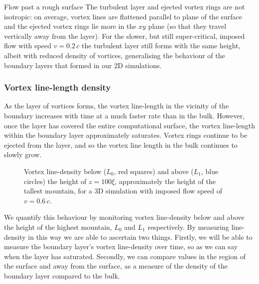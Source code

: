 \begin{chapter}{\label{cha:afm}Flow past a rough surface}
The turbulent layer and ejected vortex rings are not isotropic: on average, vortex lines are flattened parallel to plane of the surface and the ejected vortex rings lie more in the $xy$ plane (so that they travel vertically away from the layer). For the slower, but still super-critical, imposed flow with speed $v=0.2\,c$ the turbulent layer still forms with the same height, albeit with reduced density of vortices, generalising the behaviour of the boundary layers that formed in our 2D simulations.

\subsubsection{Vortex line-length density}
As the layer of vortices forms, the vortex line-length in the vicinity of the boundary increases with time at a much faster rate than in the bulk. However, once the layer has covered the entire computational surface, the vortex line-length within the boundary layer approximately saturates. Vortex rings continue to be ejected from the layer, and so the vortex line length in the bulk continues to slowly grow. 

\begin{figure}
  \centering
  \caption{\label{fig:vortlinedensdt}Vortex line-density below ($L_0$, red squares) and above ($L_1$, blue circles) the height of $z=100\xi$, approximately the height of the tallest mountain, for a 3D simulation with imposed flow speed of $v=0.6\,c$.} 
  \end{figure}
We quantify this behaviour by monitoring vortex line-density below and above the height of the highest mountain, $L_0$ and $L_1$ respectively. By measuring line-density in this way we are able to ascertain two things. Firstly, we will be able to measure the boundary layer's vortex line-density over time, so as we can say when the layer has saturated. Secondly, we can compare values in the region of the surface and away from the surface, as a measure of the density of the boundary layer compared to the bulk.


\end{chapter}
